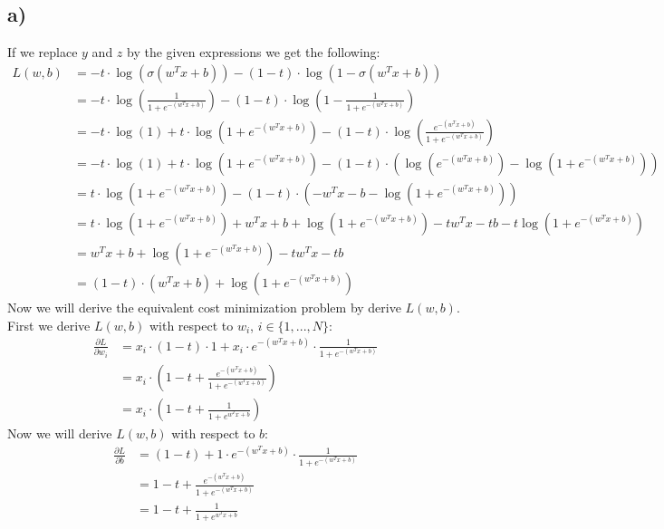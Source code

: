 \documentclass[a4paper]{article}
\begin{document}
    \subsection*{a)}
        If we replace $y$ and $z$ by the given expressions we get the following:
        \begin{align}
            L(w,b) &= -t \cdot \log\left(\sigma(w^T x + b)\right) - (1-t) \cdot \log\left(1 - \sigma(w^T x + b)\right)\\
            &= -t \cdot \log\left(\frac{1}{1 + e^{-(w^T x + b)}}\right) - (1-t) \cdot \log\left(1 - \frac{1}{1 + e^{-(w^T x + b)}}\right)\\
            &= -t \cdot \log\left(1\right) + t \cdot \log\left(1 + e^{-(w^T x + b)}\right) - (1-t) \cdot \log\left(\frac{e^{-(w^T x + b)}}{1 + e^{-(w^T x + b)}}\right)\\
            &= -t \cdot \log\left(1\right) + t \cdot \log\left(1 + e^{-(w^T x + b)}\right) - (1-t) \cdot \left(\log\left(e^{-(w^T x + b)}\right) - \log\left(1 + e^{-(w^T x + b)}\right)\right)\\
            &= t \cdot \log\left(1 + e^{-(w^T x + b)}\right) - (1-t) \cdot \left(-w^T x - b - \log\left(1 + e^{-(w^T x + b)}\right)\right)\\
            &= t \cdot \log\left(1 + e^{-(w^T x + b)}\right) + w^T x + b + \log\left(1 + e^{-(w^T x + b)}\right) - tw^T x - tb - t \log\left(1 + e^{-(w^T x + b)}\right)\\
            &= w^T x + b + \log\left(1 + e^{-(w^T x + b)}\right) - tw^T x - tb\\
            &= (1-t) \cdot (w^T x + b) + \log\left(1 + e^{-(w^T x + b)}\right)
        \end{align}
        Now we will derive the equivalent cost minimization problem by derive $L(w,b)$.
        First we derive $L(w,b)$ with respect to $w_i$, $i \in \{1,...,N\}$:
        \begin{align}
            \frac{\partial L}{\partial w_i} &= x_i \cdot (1-t) \cdot 1 + x_i \cdot e^{-(w^T x + b)} \cdot \frac{1}{1 + e^{-(w^T x + b)}}\\
            &= x_i \cdot \left(1 - t + \frac{e^{-(w^T x + b)}}{1 + e^{-(w^T x + b)}}\right)\\
            &= x_i \cdot \left(1 - t + \frac{1}{1 + e^{w^T x + b}}\right)
        \end{align}
        Now we will derive $L(w,b)$ with respect to $b$:
        \begin{align}
            \frac{\partial L}{\partial b} &= (1-t) + 1 \cdot e^{-(w^T x + b)} \cdot \frac{1}{1 + e^{-(w^T x + b)}}\\
            &= 1 - t + \frac{e^{-(w^T x + b)}}{1 + e^{-(w^T x + b)}}\\
            &= 1 - t + \frac{1}{1 + e^{w^T x + b}}
        \end{align}
\end{document}
